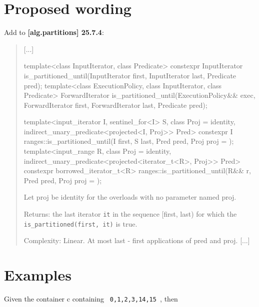 \documentclass{wg21}
\newcommand{\cc}[1]{\texttt{#1}}
\begin{document}
\section{Proposed wording}
Add to \textbf{[alg.partitions] 25.7.4}:
\begin{quote}
[...]	
\begin{itemdecl}
template<class InputIterator, class Predicate>
  constexpr InputIterator is_partitioned_until(InputIterator first, InputIterator last,
                                               Predicate pred);
template<class ExecutionPolicy, class InputIterator, class Predicate>
  ForwardIterator is_partitioned_until(ExecutionPolicy&& exec, ForwardIterator first,
                                       ForwardIterator last, Predicate pred);
\end{itemdecl}

\begin{itemdecl}
template<input_iterator I, sentinel_for<I> S, class Proj = identity,
         indirect_unary_predicate<projected<I, Proj>> Pred>
  constexpr I ranges::is_partitioned_until(I first, S last, Pred pred,
                                           Proj proj = {});	
template<input_range R, class Proj = identity, 
         indirect_unary_predicate<projected<iterator_t<R>, Proj>> Pred>
  constexpr borrowed_iterator_t<R> ranges::is_partitioned_until(R&& r, Pred pred,
                                                                Proj proj = {});
\end{itemdecl}
    Let proj be identity{} for the overloads with no parameter named proj.
    
    Returns: the last iterator \cc{it} in the sequence [first, last) for which the \cc{is_partitioned(first, it)} is true.
    
    Complexity: Linear. At most last - first applications of pred and proj.
[...]
\end{quote}

\section{Examples}
Given the container c containing \cc{ 0,1,2,3,14,15 }, then
\begin{quote}
\end{quote}
\end{document}
